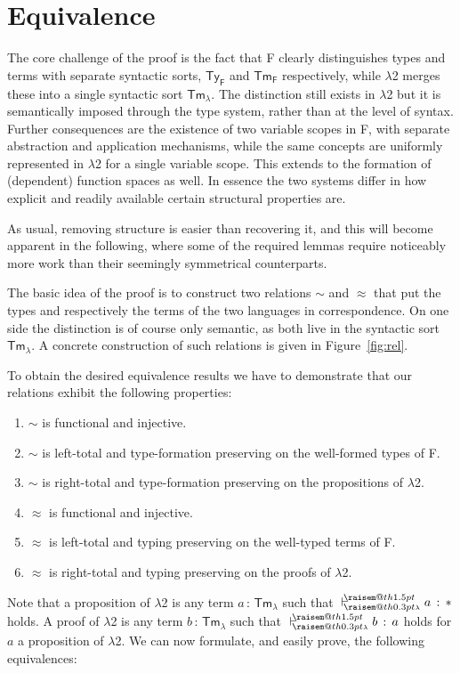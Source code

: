 \documentclass[a4paper,UKenglish]{lipics-v2016}
\makeatletter
\newcommand{\ms}{\,}
\newcommand{\mrel}[1]{\mathrel{\ms #1 \ms}}
\newcommand{\OF}{\mrel{:}}
\newcommand{\SysL}{$\lambda$2\xspace}
\newcommand{\TyF}{\ensuremath{\mathsf{Ty_{F}}}}
\newcommand{\TmF}{\ensuremath{\mathsf{Tm_{F}}}}
\newcommand{\TmL}{\ensuremath{\mathsf{Tm_{\lambda}}}}
\newcommand{\raisemath}[1]{\mathpalette{\raisem@th{#1}}}
\newcommand{\raisem@th}[3]{\raisebox{#1}{\ensuremath{#2#3}}}
\newcommand{\tsAnnot}[2]{\vdash\hspace{-.7em}^{\raisemath{1.5pt}{\scriptscriptstyle{#2}}}_{\raisemath{0.3pt}{\scriptscriptstyle{#1}}}} %
\newcommand{\tyL}{\tsAnnot{\lambda}{}} %
\newcommand{\typingL}[3]{\ensuremath{{#1} \mathrel{\tyL} #2 \OF #3}}
\newcommand{\tyr}{\mathrel{\sim}}
\newcommand{\tmr}{\mathrel{\approx}}
\newcommand{\Prp}{\ensuremath{\textrm{\textasteriskcentered}}}
\makeatother
\begin{document}
\section{Equivalence}
\label{sec:equi}

The core challenge of the proof is the fact that F clearly distinguishes types and terms with separate syntactic sorts, $\TyF$ and $\TmF$ respectively, while \SysL merges these into a single syntactic sort $\TmL$.
The distinction still exists in \SysL but it is semantically imposed through the type system, rather than at the level of syntax.
Further consequences are the existence of two variable scopes in F, with separate abstraction and application mechanisms, while the same concepts are uniformly represented in \SysL for a single variable scope.
This extends to the formation of (dependent) function spaces as well.
In essence the two systems differ in how explicit and readily available certain structural properties are.

As usual, removing structure is easier than recovering it, and this will become apparent in the following, where some of the required lemmas require noticeably more work than their seemingly symmetrical counterparts.

The basic idea of the proof is to construct two relations $\tyr$ and $\tmr$ that put the types and respectively the terms of the two languages in correspondence.
On one side the distinction is of course only semantic, as both live in the syntactic sort $\TmL$.
A concrete construction of such relations is given in Figure~\ref{fig:rel}.

To obtain the desired equivalence results we have to demonstrate that our relations exhibit the following properties:
\begin{enumerate}
  \item $\tyr$ is functional and injective.
  \item $\tyr$ is left-total and type-formation preserving on the well-formed types of F.
  \item $\tyr$ is right-total and type-formation preserving on the propositions of \SysL.
  \item $\tmr$ is functional and injective.
  \item $\tmr$ is left-total and typing preserving on the well-typed terms of F.
  \item $\tmr$ is right-total and typing preserving on the proofs of \SysL.
\end{enumerate}
Note that a proposition of \SysL is any term $a \OF \TmL$ such that $\typingL{}{a}{\Prp}$ holds.
A proof of \SysL is any term $b \OF \TmL$ such that $\typingL{}{b}{a}$ holds for $a$ a proposition of \SysL.
We can now formulate, and easily prove, the following equivalences:
\end{document}
